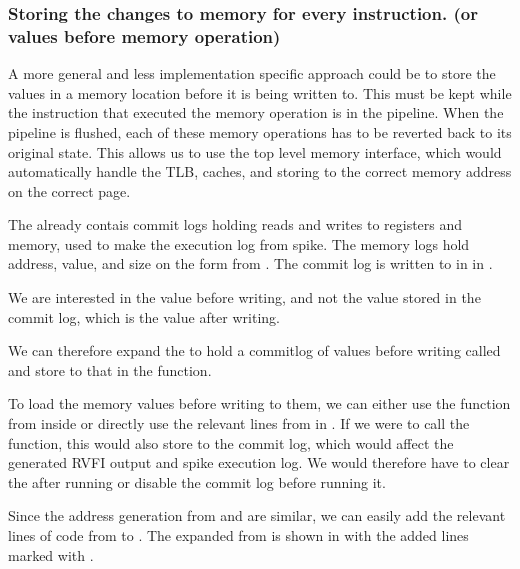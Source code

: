 \subsubsection{Storing the changes to memory for every instruction. (or values before memory operation)}

A more general and less implementation specific approach could be to store the values in a memory location before it is being written to. This must be kept while the instruction that executed the memory operation is in the pipeline. When the pipeline is flushed, each of these memory operations has to be reverted back to its original state. This allows us to use the top level memory interface, which would automatically handle the TLB, caches, and storing to the correct memory address on the correct page.

The  already contais commit logs holding reads and writes to registers and memory, used to make the execution log from spike. The memory logs hold address, value, and size on the form  from . The commit log is written to in  in .

We are interested in the value before writing, and not the value stored in the commit log, which is the value after writing. 

We can therefore expand the  to hold a commitlog of values before writing called  and store to that in the  function.

To load the memory values before writing to them, we can either use the  function from inside  or directly use the relevant lines from  in . If we were to call the  function, this would also store to the  commit log, which would affect the generated RVFI output and spike execution log. We would therefore have to clear the  after running  or disable the commit log before running it.

Since the address generation from  and  are similar, we can easily add the relevant lines of code from  to . The expanded  from  is shown in  with the added lines marked with \ccode{+}.


